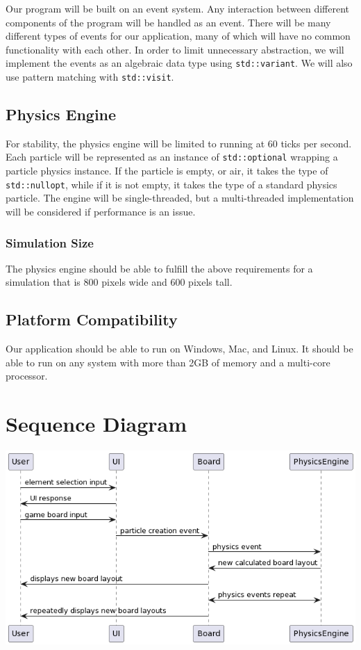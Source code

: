\documentclass[12pt]{article}
\begin{document}
    Our program will be built on an event system.
    Any interaction between different components of the program will be handled
    as an event.
    There will be many different types of events for our application, many of
    which will have no common functionality with each other.
    In order to limit unnecessary abstraction, we will implement the events as
    an algebraic data type using \verb|std::variant|.
    We will also use pattern matching with \verb|std::visit|.

    \subsection{Physics Engine}

    For stability, the physics engine will be limited to running at 60 ticks per
    second.
    Each particle will be represented as an instance of \verb|std::optional|
    wrapping a particle physics instance. If the particle is empty, or air, it
    takes the type of \verb|std::nullopt|, while if it is not empty, it takes
    the type of a standard physics particle. The engine will be single-threaded,
    but a multi-threaded implementation will be considered if performance is an
    issue.

    \subsubsection{Simulation Size} The physics engine should be able to fulfill
    the above requirements for a simulation that is 800 pixels wide and 600
    pixels tall.

    \subsection{Platform Compatibility}

    Our application should be able to run on Windows, Mac, and Linux.
    It should be able to run on any system with more than 2GB of memory and a
    multi-core processor.

    \section{Sequence Diagram}

    \begin{center}
        \includegraphics[scale=0.7]{sequence.png}
    \end{center}
\end{document}
